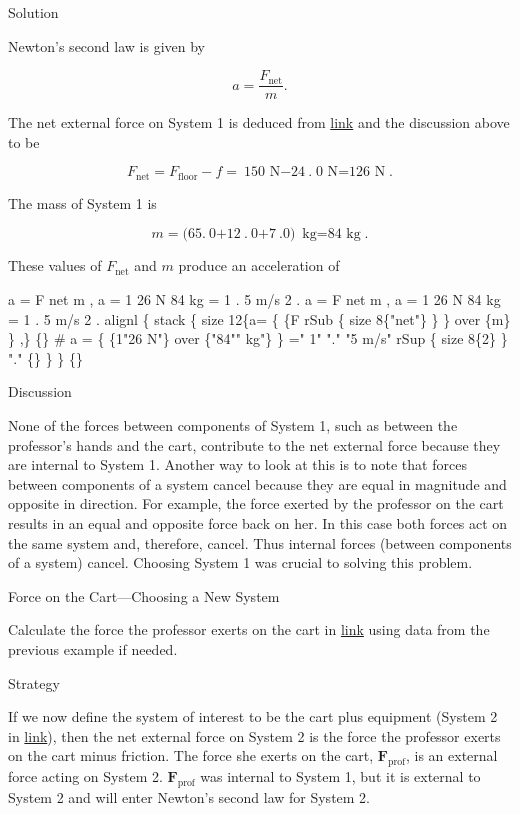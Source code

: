 \documentclass[
]{book}
\begin{document}
{Solution}

Newton's second law is given by

\leavevmode{}%
\[{a = \frac{F_{\text{net}}}{m}}.\]

The net external force on System 1 is deduced from
\protect\hyperlink{import-auto-id2324690}{link} and the
discussion above to be

\leavevmode{}%
\[{{{F_{\text{net}} = {F_{\text{floor}} - f}} = {\text{150\ N} - \text{24}}}\text{.}{\text{0\ N} = \text{126\ N}}}.\]

The mass of System 1 is

\leavevmode{}%
\[{{m = (}\text{65}\text{.}{\text{0} + \text{12}}\text{.}{\text{0} + \text{7}}\text{.}0){\ \text{kg} = \text{84\ kg}}}.\]

These values of \(F_{\text{net}}{}\) and \(m{}\) produce an acceleration of

\leavevmode{}%
{a = F net m , a = 1 26 N 84 kg = 1 . 5 m/s 2 . a = F net m , a = 1 26
N 84 kg = 1 . 5 m/s 2 . alignl \{ stack \{ size 12\{a= \{ \{F rSub \{ size
8\{"net"\} \} \} over \{m\} \} ,\} \{\} \# a = \{ \{1"26 N"\} over \{"84""
kg"\} \} =" 1" "." "5 m/s" rSup \{ size 8\{2\} \} "." \{\} \} \} \{\}}

{Discussion}

None of the forces between components of System 1, such as between the
professor's hands and the cart, contribute to the net external force
because they are internal to System 1. Another way to look at this is to
note that forces between components of a system cancel because they are
equal in magnitude and opposite in direction. For example, the force
exerted by the professor on the cart results in an equal and opposite
force back on her. In this case both forces act on the same system and,
therefore, cancel. Thus internal forces (between components of a system)
cancel. Choosing System 1 was crucial to solving this problem.

\hypertarget{fs-id2092526}{}
Force on the Cart---Choosing a New System

Calculate the force the professor exerts on the cart in
\protect\hyperlink{import-auto-id2324690}{link} using data from
the previous example if needed.

{Strategy}

If we now define the system of interest to be the cart plus equipment
(System 2 in \protect\hyperlink{import-auto-id2324690}{link}),
then the net external force on System 2 is the force the professor
exerts on the cart minus friction. The force she exerts on the cart,
\(\textbf{F}_{\text{prof}}{}\), is an external force acting on System 2.
\(\textbf{F}_{\text{prof}}{}\) was internal to System 1, but it is
external to System 2 and will enter Newton's second law for System 2.
\end{document}
